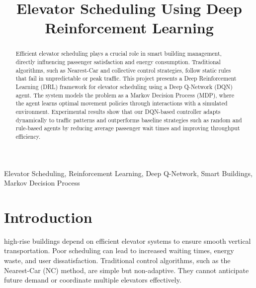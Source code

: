 \documentclass[conference]{IEEEtran}
\begin{document}
\title{Elevator Scheduling Using Deep Reinforcement Learning}

\author{
\and
{}
}

\maketitle

\begin{abstract}
Efficient elevator scheduling plays a crucial role in smart building management, directly influencing passenger satisfaction and energy consumption. Traditional algorithms, such as Nearest-Car and collective control strategies, follow static rules that fail in unpredictable or peak traffic. This project presents a Deep Reinforcement Learning (DRL) framework for elevator scheduling using a Deep Q-Network (DQN) agent. The system models the problem as a Markov Decision Process (MDP), where the agent learns optimal movement policies through interactions with a simulated environment. Experimental results show that our DQN-based controller adapts dynamically to traffic patterns and outperforms baseline strategies such as random and rule-based agents by reducing average passenger wait times and improving throughput efficiency.
\end{abstract}

\begin{IEEEkeywords}
Elevator Scheduling, Reinforcement Learning, Deep Q-Network, Smart Buildings, Markov Decision Process
\end{IEEEkeywords}

\section{Introduction}
 high-rise buildings depend on efficient elevator systems to ensure smooth vertical transportation. Poor scheduling can lead to increased waiting times, energy waste, and user dissatisfaction. Traditional control algorithms, such as the Nearest-Car (NC) method, are simple but non-adaptive. They cannot anticipate future demand or coordinate multiple elevators effectively.
\end{document}
